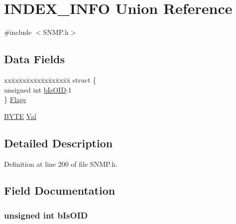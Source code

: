 \hypertarget{union_i_n_d_e_x___i_n_f_o}{}\section{I\+N\+D\+E\+X\+\_\+\+I\+N\+F\+O Union Reference}
\label{union_i_n_d_e_x___i_n_f_o}


{\ttfamily \#include $<$S\+N\+M\+P.\+h$>$}

\subsection*{Data Fields}
\begin{DoxyCompactItemize}
\item 
\begin{tabbing}
xx\=xx\=xx\=xx\=xx\=xx\=xx\=xx\=xx\=\kill
struct \{\\
\>unsigned int \hyperlink{union_i_n_d_e_x___i_n_f_o_a474d4bab38f06910ffa5cd4ae78ebfdf}{bIsOID}:1\\
\} \hyperlink{union_i_n_d_e_x___i_n_f_o_a7eae2f70d934c7ec97c4c2530f9e5e17}{Flags}\\

\end{tabbing}\item 
\hyperlink{_generic_type_defs_8h_a4ae1dab0fb4b072a66584546209e7d58}{B\+Y\+T\+E} \hyperlink{union_i_n_d_e_x___i_n_f_o_a5ab8c2bf45b20b5f7aa3a4f083896cec}{Val}
\end{DoxyCompactItemize}


\subsection{Detailed Description}


Definition at line 200 of file S\+N\+M\+P.\+h.



\subsection{Field Documentation}
\hypertarget{union_i_n_d_e_x___i_n_f_o_a474d4bab38f06910ffa5cd4ae78ebfdf}{}
\subsubsection[{b\+Is\+O\+I\+D}]{\setlength{\rightskip}{0pt plus 5cm}unsigned int b\+Is\+O\+I\+D}\label{union_i_n_d_e_x___i_n_f_o_a474d4bab38f06910ffa5cd4ae78ebfdf}


